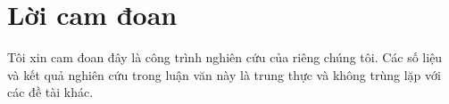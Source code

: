 \chapter*{Lời cam đoan}
\label{chap:Reassurances}

Tôi xin cam đoan đây là công trình nghiên cứu của riêng chúng tôi. Các số liệu và kết quả nghiên cứu trong luận văn này là trung thực và không trùng lặp với các đề tài khác.